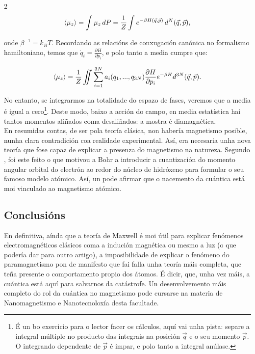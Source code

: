 \begin{refsection}
\begin{multicols}{2}
\begin{equation}\label{ec.: bvl-mec_est}
    \braket{\mu_z} = \int \mu_z\, dP = \frac{1}{Z}\int e^{-\beta
    H(\vec q,\vec p)} \, d^N(\vec q, \vec p),
\end{equation}

onde $\beta^{-1} = k_B T$. Recordando as relacións de conxugación canónica no
formalismo hamiltoniano, temos que $\dot q_i = \frac{\partial H}{\partial
p_i}$, e polo tanto a media cumpre que:

\begin{equation}
    \braket{\mu_z} = \frac{1}{Z}\iint\sum_{i=1}^{3N} a_i
    (q_1,...,q_{3N}) \frac{\partial H}{\partial p_i}e^{-\beta
    H}d^{3N}(\vec q,\vec p).
\end{equation}

No entanto, se integrarmos na totalidade do espazo de fases, veremos que a
media é igual a cero\footnote{É un bo exercicio para o lector facer os
cálculos, aquí vai unha pista: separe a integral múltiple no producto das
integrais na posición $\vec q$ e o seu momento $\vec p$. O integrando
dependente de $\vec p$ é impar, e polo tanto a integral anúlase.}. Deste modo,
baixo a acción do campo, en media estatística hai tantos momentos aliñados
coma desaliñados: a mostra é diamagnética.\\

En resumidas contas, de ser pola teoría clásica, non habería magnetismo
posible, nunha clara contradición coa realidade experimental. Así, era
necesaria unha nova teoría que fose capaz de explicar a presenza do magnetismo
na natureza. Segundo \citet[pp. 354-355]{van-vleck.jh_1977}, foi este feito o
que motivou a Bohr a introducir a cuantización do momento angular orbital do
electrón ao redor do núcleo de hidróxeno para formular o seu famoso modelo
atómico. Así, un pode afirmar que o nacemento da cuántica está moi vinculado ao
magnetismo atómico.

\subsection*{Conclusións}

En definitiva, aínda que a teoría de Maxwell é moi útil para explicar fenómenos
electromagnéticos clásicos coma a indución magnética ou mesmo a luz (o que
podería dar para outro artigo), a imposibilidade de explicar o fenómeno do
paramagnetismo pon de manifesto que fai falla unha teoría máis completa, que
teña presente o comportamento propio dos átomos. É dicir, que, unha vez máis, a
cuántica está aquí para salvarnos da catástrofe. Un desenvolvemento máis
completo do rol da cuántica no magnetismo pode cursarse na materia de
Nanomagnetismo e Nanotecnoloxía desta facultade.

\printbibliography

\end{multicols}
\end{refsection}
